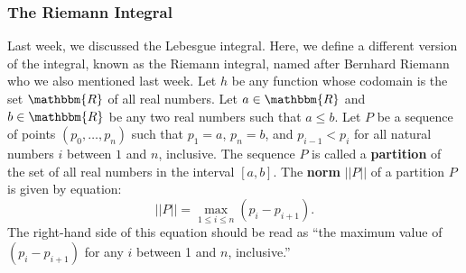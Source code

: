 \documentclass[11pt]{article}
\theoremstyle{definition}
\theoremstyle{remark}
\begin{document}
\subsubsection{The Riemann Integral}
Last week, we discussed the Lebesgue integral. Here, we define a different version of the integral, known as the Riemann integral, named after Bernhard Riemann who we also mentioned last week. Let $h$ be any function whose codomain is the set $\mathbbm{R}$ of all real numbers. Let $a\in\mathbbm{R}$ and $b\in\mathbbm{R}$ be any two real numbers such that $a\leq b$. Let $P$ be a sequence of points $(p_{0},\dots,p_{n})$ such that $p_{1}=a$, $p_{n}=b$, and $p_{i-1}<p_{i}$ for all natural numbers $i$ between $1$ and $n$, inclusive. The sequence $P$ is called a \textbf{partition} of the set of all real numbers in the interval $[a,b]$. The \textbf{norm} $||P||$ of a partition $P$ is given by equation:
$$||P||=\max_{1\leq i\leq n}(p_{i}-p_{i+1}).$$
The right-hand side of this equation should be read as ``the maximum value of $(p_{i}-p_{i+1})$ for any $i$ between 1 and $n$, inclusive.''\par 
\end{document}
